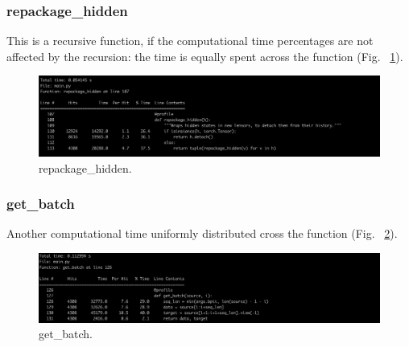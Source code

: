 \documentclass[11pt]{article}
\newcommand{\0}{\mat{0}}
\begin{document}
\begin{itemize}
   \subsubsection*{repackage\_hidden}
   This is a recursive function, if the computational time percentages are not affected by the recursion: the time is equally spent across the function  (Fig. ~\ref{fig:repackagehidden}).
    \begin{figure}[h!]
         \centering
 	 \includegraphics[width=\linewidth]{repackageHidden.png}
 	 \caption{repackage\_hidden.}
 	 \label{fig:repackagehidden}
   \end{figure}
   
   \subsubsection*{get\_batch}
   Another computational time uniformly distributed cross the function (Fig. ~\ref{fig:getbatch}).
   \begin{figure}[h!]
  	\centering
 	 \includegraphics[width=\linewidth]{getBatch.png}
 	 \caption{get\_batch.}
 	 \label{fig:getbatch}
   \end{figure}


\end{itemize}
\end{document}
